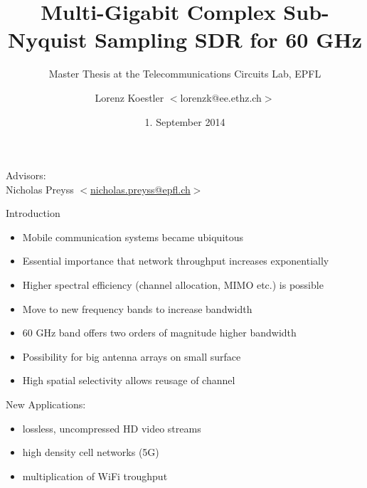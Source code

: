 \documentclass[10pt]{beamer}
\title{Multi-Gigabit Complex Sub-Nyquist Sampling SDR for 60 GHz}
\subtitle{Master Thesis at the Telecommunications Circuits Lab, EPFL}
\author{Lorenz Koestler $ < $lorenzk@ee.ethz.ch$ > $}
\date[1.9..2013]{1. September 2014}
\begin{document}
{
  \begin{frame}
    \titlepage

    Advisors: \\
    Nicholas Preyss $ < $\href{mailto:nicholas.preyss@epfl.ch}{nicholas.preyss@epfl.ch}$ > $ \\
  \end{frame}
}

\begin{frame}{Introduction}
  \begin{itemize}
  \item Mobile communication systems became ubiquitous
  \item Essential importance that network throughput increases
    exponentially
  \item Higher spectral efficiency (channel allocation, MIMO etc.) is possible
  \item Move to new frequency bands to increase bandwidth
  \item 60 GHz band offers two orders of magnitude higher bandwidth
  \item Possibility for big antenna arrays on small surface
  \item High spatial selectivity allows reusage of channel
  \end{itemize}
  \begin{block}{New Applications:}
    \begin{itemize}
    \item lossless, uncompressed HD video streams
    \item high density cell networks (5G)
    \item multiplication of WiFi troughput
    \end{itemize}
  \end{block}
\end{frame}
\end{document}
